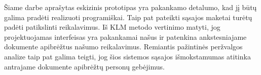 
Šiame darbe aprašytas eskizinis prototipas yra pakankamo detalumo, kad
jį būtų galima pradėti realizuoti programiškai. Taip pat pateikti
sąsajos maketai turėtų padėti patikslinti reikalavimus. Iš KLM
metodo vertinimo matyti, jog projektuojamas interfeisas yra pakankamai
našus ir patenkina ankstesniajame dokumente apibrėžtus našumo
reikalavimus. Remiantis pažintinės peržvalgos analize taip pat galima
teigti, jog šios sistemos sąsajos išmokstamumas atitinka
antrajame dokumente apibrėžtų personų gebėjimus.


\newpage

